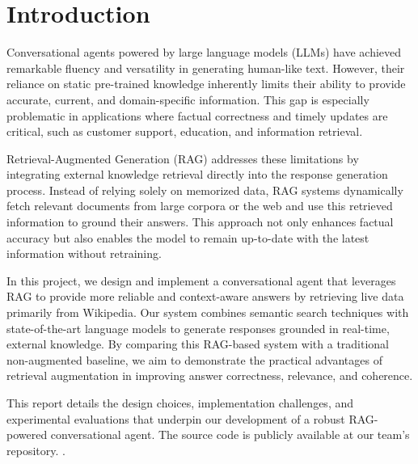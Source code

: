 \documentclass[fleqn,moreauthors,10pt]{ds_report}
\affiliation{\textit{Advisors: Aleš Žagar}}
\begin{document}
\flushbottom 

\maketitle 

\thispagestyle{empty} 


\section*{Introduction}

Conversational agents powered by large language models (LLMs) have achieved remarkable fluency and versatility in generating human-like text. However, their reliance on static pre-trained knowledge inherently limits their ability to provide accurate, current, and domain-specific information. This gap is especially problematic in applications where factual correctness and timely updates are critical, such as customer support, education, and information retrieval.

Retrieval-Augmented Generation (RAG) addresses these limitations by integrating external knowledge retrieval directly into the response generation process. Instead of relying solely on memorized data, RAG systems dynamically fetch relevant documents from large corpora or the web and use this retrieved information to ground their answers. This approach not only enhances factual accuracy but also enables the model to remain up-to-date with the latest information without retraining.

In this project, we design and implement a conversational agent that leverages RAG to provide more reliable and context-aware answers by retrieving live data primarily from Wikipedia. Our system combines semantic search techniques with state-of-the-art language models to generate responses grounded in real-time, external knowledge. By comparing this RAG-based system with a traditional non-augmented baseline, we aim to demonstrate the practical advantages of retrieval augmentation in improving answer correctness, relevance, and coherence.

This report details the design choices, implementation challenges, and experimental evaluations that underpin our development of a robust RAG-powered conversational agent. The source code is publicly available at our team’s repository. \cite{nlp2024rag}.
\end{document}
